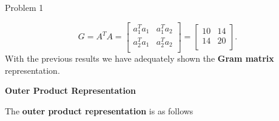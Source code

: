 \begin{problem}{Problem 1}
\begin{Highlight}[Solution]
        \begin{equation*}
            G = A^{T}A = 
            \begin{bmatrix}
                a_{1}^{T}a_{1} & a_{1}^{T}a_{2} \\
                a_{2}^{T}a_{1} & a_{2}^{T}a_{2} \\
            \end{bmatrix}
            = 
            \begin{bmatrix}
                10 & 14 \\
                14 & 20 \\
            \end{bmatrix}.
        \end{equation*}
        With the previous results we have adequately shown the \textbf{Gram matrix} representation. \vspace*{1em}

        \noindent \textbf{Outer Product Representation} \vspace*{1em}

        The \textbf{outer product representation} is as follows


\end{Highlight}
\end{problem}
